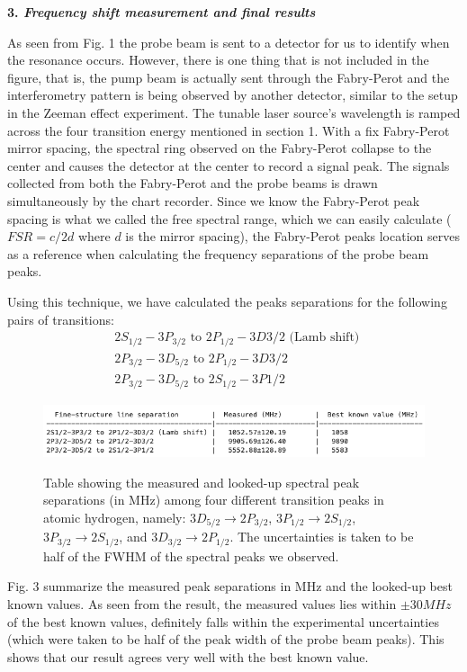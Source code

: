 \documentclass[11pt]{article}
\begin{document}
\textbf{3. \textit{Frequency shift measurement and final results}}
\smallskip

As seen from Fig. 1 the probe beam is sent to a detector for us to identify when the resonance occurs. However, there is one thing that is not included in the figure, that is, the pump beam is actually sent through the Fabry-Perot and the interferometry pattern is being observed by another detector, similar to the setup in the Zeeman effect experiment. The tunable laser source's wavelength is ramped across the four transition energy mentioned in section 1. With a fix Fabry-Perot mirror spacing, the spectral ring observed on the Fabry-Perot collapse to the center and causes the detector at the center to record a signal peak. The signals collected from both the Fabry-Perot and the probe beams is drawn simultaneously by the chart recorder. Since we know the Fabry-Perot peak spacing is what we called the free spectral range, which we can easily calculate ($FSR = c/2d$ where $d$ is the mirror spacing), the Fabry-Perot peaks location serves as a reference when calculating the frequency separations of the probe beam peaks. 

Using this technique, we have calculated the peaks separations for the following pairs of transitions: 
\begin{align*}
&2S_{1/2} - 3P_{3/2} \text{ to } 2P_{1/2} - 3D{3/2} \text{ (Lamb shift) }\\
&2P_{3/2} - 3D_{5/2} \text{ to } 2P_{1/2} - 3D{3/2}\\
&2P_{3/2} - 3D_{5/2} \text{ to } 2S_{1/2} - 3P{1/2}
\end{align*}

\begin{figure}[H]
\begin{center}
\includegraphics[width=14cm]{result}
\label{Fig. 3}
\caption{Table showing the measured and looked-up spectral peak separations (in MHz) among four different transition peaks in atomic hydrogen, namely: $3D_{5/2} \rightarrow 2P_{3/2}$, $3P_{1/2} \rightarrow 2S_{1/2}$, $3P_{3/2} \rightarrow 2S_{1/2}$, and $3D_{3/2} \rightarrow 2P_{1/2}$. The uncertainties is taken to be half of the FWHM of the spectral peaks we observed.}
\end{center}
\end{figure}

Fig. 3 summarize the measured peak separations in MHz and the looked-up best known values. As seen from the result, the measured values lies within $\pm30MHz$ of the best known values, definitely falls within the experimental uncertainties (which were taken to be half of the peak width of the probe beam peaks). This shows that our result agrees very well with the best known value.

 
\end{document}
